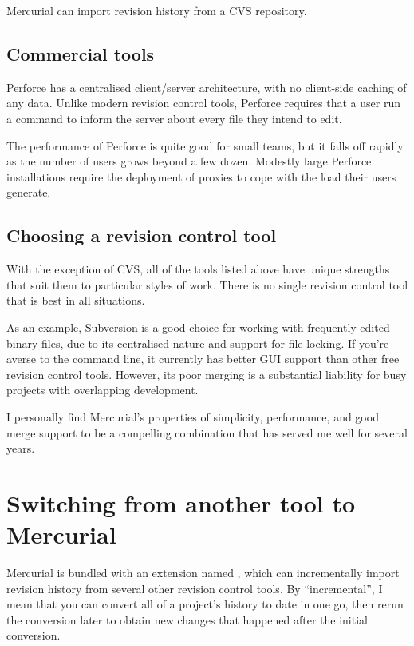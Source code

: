 Mercurial can import revision history from a CVS repository.


\subsection{Commercial tools}

Perforce has a centralised client/server architecture, with no
client-side caching of any data.  Unlike modern revision control
tools, Perforce requires that a user run a command to inform the
server about every file they intend to edit.

The performance of Perforce is quite good for small teams, but it
falls off rapidly as the number of users grows beyond a few dozen.
Modestly large Perforce installations require the deployment of
proxies to cope with the load their users generate.


\subsection{Choosing a revision control tool}

With the exception of CVS, all of the tools listed above have unique
strengths that suit them to particular styles of work.  There is no
single revision control tool that is best in all situations.

As an example, Subversion is a good choice for working with frequently
edited binary files, due to its centralised nature and support for
file locking.  If you're averse to the command line, it currently has
better GUI support than other free revision control tools.  However,
its poor merging is a substantial liability for busy projects with
overlapping development.

I personally find Mercurial's properties of simplicity, performance,
and good merge support to be a compelling combination that has served
me well for several years.


\section{Switching from another tool to Mercurial}

Mercurial is bundled with an extension named , which
can incrementally import revision history from several other revision
control tools.  By ``incremental'', I mean that you can convert all of
a project's history to date in one go, then rerun the conversion later
to obtain new changes that happened after the initial conversion.


